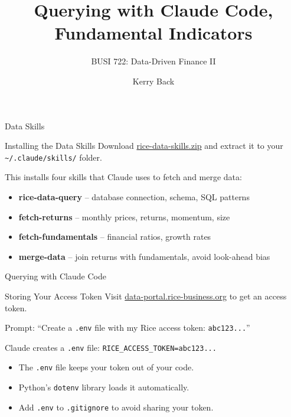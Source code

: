 \documentclass[aspectratio=169,t]{beamer}
\title{Querying with Claude Code, Fundamental Indicators}
\subtitle{BUSI 722: Data-Driven Finance II}
\author{Kerry Back}
\institute{}
\date{}
\begin{document}
\maketitle


\begin{frame}[c]
\centering
\Huge Data Skills
\end{frame}

\begin{frame}{Installing the Data Skills}
Download \href{https://busi722.kerryback.com/files/rice-data-skills.zip}{rice-data-skills.zip} and extract it to your \texttt{\textasciitilde/.claude/skills/} folder.
\vspace{0.3cm}

This installs four skills that Claude uses to fetch and merge data:
\begin{itemize}
\item \textbf{rice-data-query} -- database connection, schema, SQL patterns
\item \textbf{fetch-returns} -- monthly prices, returns, momentum, size
\item \textbf{fetch-fundamentals} -- financial ratios, growth rates
\item \textbf{merge-data} -- join returns with fundamentals, avoid look-ahead bias
\end{itemize}
\end{frame}


\begin{frame}[c]
\centering
\Huge Querying with Claude Code
\end{frame}

\begin{frame}{Storing Your Access Token}
Visit \href{https://data-portal.rice-business.org}{data-portal.rice-business.org} to get an access token.
\vspace{0.3cm}

\alert{Prompt:} ``Create a \texttt{.env} file with my Rice access token: \texttt{abc123...}''
\vspace{0.3cm}

Claude creates a \texttt{.env} file:
\texttt{RICE\_ACCESS\_TOKEN=abc123...}

\begin{itemize}
\item The \texttt{.env} file keeps your token out of your code.
\item Python's \texttt{dotenv} library loads it automatically.
\item Add \texttt{.env} to \texttt{.gitignore} to avoid sharing your token.
\end{itemize}
\end{frame}
\end{document}
